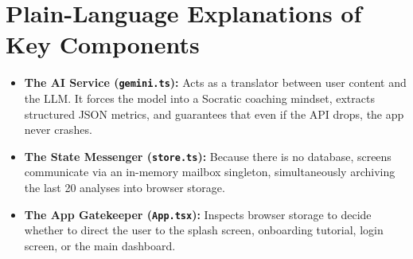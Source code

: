 \documentclass[10pt,a4paper]{report}
\begin{document}
\section{Plain-Language Explanations of Key Components}
\begin{itemize}[leftmargin=1.5em]
    \item \textbf{The AI Service (\texttt{gemini.ts}):} Acts as a translator between user content and the LLM. It forces the model into a Socratic coaching mindset, extracts structured JSON metrics, and guarantees that even if the API drops, the app never crashes.
    \item \textbf{The State Messenger (\texttt{store.ts}):} Because there is no database, screens communicate via an in-memory mailbox singleton, simultaneously archiving the last 20 analyses into browser storage.
    \item \textbf{The App Gatekeeper (\texttt{App.tsx}):} Inspects browser storage to decide whether to direct the user to the splash screen, onboarding tutorial, login screen, or the main dashboard.
\end{itemize}
\end{document}
